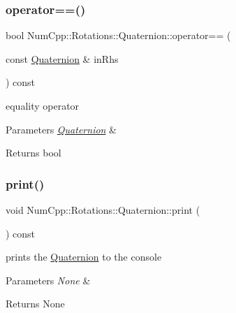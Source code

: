 \subsubsection{\texorpdfstring{operator==()}{operator==()}}
{\footnotesize\ttfamily bool Num\+Cpp\+::\+Rotations\+::\+Quaternion\+::operator== (\begin{DoxyParamCaption}\item[{const \mbox{\hyperlink{class_num_cpp_1_1_rotations_1_1_quaternion}{Quaternion}} \&}]{in\+Rhs }\end{DoxyParamCaption}) const\hspace{0.3cm}{\ttfamily [inline]}}

equality operator


\begin{DoxyParams}{Parameters}
{\em \mbox{\hyperlink{class_num_cpp_1_1_rotations_1_1_quaternion}{Quaternion}}} & \\
\hline
\end{DoxyParams}
\begin{DoxyReturn}{Returns}
bool 
\end{DoxyReturn}
\mbox{\label{class_num_cpp_1_1_rotations_1_1_quaternion_a99e71bd7900477b9eedc1372002a1163}} 
\subsubsection{\texorpdfstring{print()}{print()}}
{\footnotesize\ttfamily void Num\+Cpp\+::\+Rotations\+::\+Quaternion\+::print (\begin{DoxyParamCaption}{ }\end{DoxyParamCaption}) const\hspace{0.3cm}{\ttfamily [inline]}}

prints the \mbox{\hyperlink{class_num_cpp_1_1_rotations_1_1_quaternion}{Quaternion}} to the console


\begin{DoxyParams}{Parameters}
{\em None} & \\
\hline
\end{DoxyParams}
\begin{DoxyReturn}{Returns}
None 
\end{DoxyReturn}
\mbox{\label{class_num_cpp_1_1_rotations_1_1_quaternion_a71862c53e031f0667397f97f2bf08a09}} 
